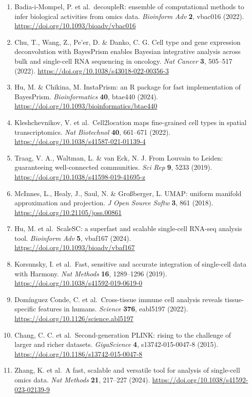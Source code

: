 \begin{enumerate}
\item
  Badia-i-Mompel, P. et al.~decoupleR: ensemble of computational methods to infer biological activities from omics data. \emph{Bioinform Adv} \textbf{2}, vbac016 (2022). \url{https://doi.org/10.1093/bioadv/vbac016}
\item
  Chu, T., Wang, Z., Pe'er, D. \& Danko, C. G. Cell type and gene expression deconvolution with BayesPrism enables Bayesian integrative analysis across bulk and single-cell RNA sequencing in oncology. \emph{Nat Cancer} \textbf{3}, 505--517 (2022). \url{https://doi.org/10.1038/s43018-022-00356-3}
\item
  Hu, M. \& Chikina, M. InstaPrism: an R package for fast implementation of BayesPrism. \emph{Bioinformatics} \textbf{40}, btae440 (2024). \url{https://doi.org/10.1093/bioinformatics/btae440}
\item
  Kleshchevnikov, V. et al.~Cell2location maps fine-grained cell types in spatial transcriptomics. \emph{Nat Biotechnol} \textbf{40}, 661--671 (2022). \url{https://doi.org/10.1038/s41587-021-01139-4}
\item
  Traag, V. A., Waltman, L. \& van Eck, N. J. From Louvain to Leiden: guaranteeing well-connected communities. \emph{Sci Rep} \textbf{9}, 5233 (2019). \url{https://doi.org/10.1038/s41598-019-41695-z}
\item
  McInnes, L., Healy, J., Saul, N. \& Großberger, L. UMAP: uniform manifold approximation and projection. \emph{J Open Source Softw} \textbf{3}, 861 (2018). \url{https://doi.org/10.21105/joss.00861}
\item
  Hu, M. et al.~ScaleSC: a superfast and scalable single-cell RNA-seq analysis tool. \emph{Bioinform Adv} \textbf{5}, vbaf167 (2024). \url{https://doi.org/10.1093/bioadv/vbaf167}
\item
  Korsunsky, I. et al.~Fast, sensitive and accurate integration of single-cell data with Harmony. \emph{Nat Methods} \textbf{16}, 1289--1296 (2019). \url{https://doi.org/10.1038/s41592-019-0619-0}
\item
  Domínguez Conde, C. et al.~Cross-tissue immune cell analysis reveals tissue-specific features in humans. \emph{Science} \textbf{376}, eabl5197 (2022). \url{https://doi.org/10.1126/science.abl5197}
\item
  Chang, C. C. et al.~Second-generation PLINK: rising to the challenge of larger and richer datasets. \emph{GigaScience} \textbf{4}, s13742-015-0047-8 (2015). \url{https://doi.org/10.1186/s13742-015-0047-8}
\item
  Zhang, K. et al.~A fast, scalable and versatile tool for analysis of single-cell omics data. \emph{Nat Methods} \textbf{21}, 217--227 (2024). \url{https://doi.org/10.1038/s41592-023-02139-9}

\end{enumerate}
